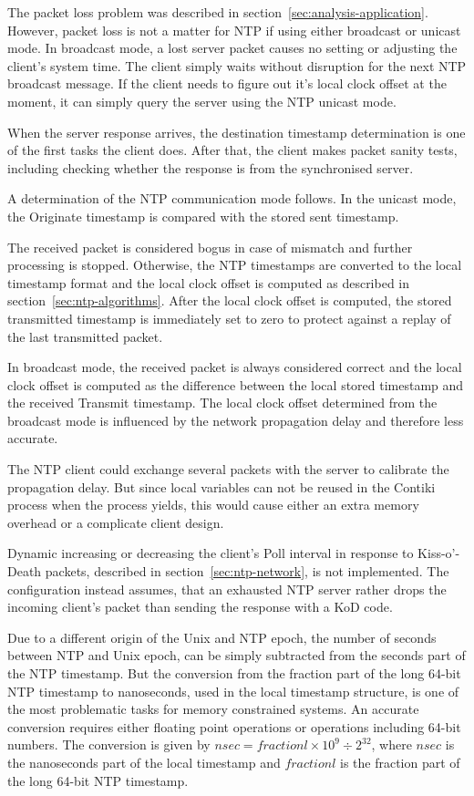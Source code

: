 The packet loss problem was described in section~\ref{sec:analysis-application}.
However, packet loss is not a matter for NTP if using either broadcast or unicast mode.
In broadcast mode, a lost server packet causes no setting or adjusting the client's system time.
The client simply waits without disruption for the next NTP broadcast message.
If the client needs to figure out it's local clock offset at the moment,
it can simply query the server using the NTP unicast mode.



When the server response arrives,
the destination timestamp determination is one of the first tasks the client does.
After that, the client makes packet sanity tests, including
checking whether the response is from the synchronised server.

A determination of the NTP communication mode follows.
In the unicast mode, the Originate timestamp is compared with the stored sent timestamp.

The received packet is considered bogus in case of mismatch and further processing is stopped.
Otherwise, the NTP timestamps are converted to the local timestamp format and
the local clock offset is computed as described in section~\ref{sec:ntp-algorithms}.
After the local clock offset is computed,
the stored transmitted timestamp is immediately set to zero
to protect against a replay of the last transmitted packet.

In broadcast mode, the received packet is always considered correct
and the local clock offset is computed as the difference between the local stored timestamp
and the received Transmit timestamp.
The local clock offset determined from the broadcast mode
is influenced by the network propagation delay and therefore less accurate.

The NTP client could exchange several packets with the server to calibrate the propagation delay.
But since local variables can not be reused in the Contiki process when the process yields,
this would cause either an extra memory overhead or a complicate client design.


Dynamic increasing or decreasing the client's Poll interval in response to
Kiss-o'-Death packets, described in section~\ref{sec:ntp-network}, is not implemented.
The configuration instead assumes, that an exhausted NTP server rather drops the incoming
client's packet than sending the response with a KoD code.


Due to a different origin of the Unix and NTP epoch,
the number of seconds between NTP and Unix epoch,
can be simply subtracted from the seconds part of the NTP timestamp.
But the conversion from the fraction part of the long 64-bit NTP timestamp to nanoseconds,
used in the local timestamp structure, %
is one of the most problematic tasks for memory constrained systems.
An accurate conversion requires either floating point operations or operations including 64-bit numbers.
The conversion is given by
$nsec = fractionl \times 10^9 \div 2^{32}$, where $nsec$ is the nanoseconds part of the local timestamp
and $fractionl$ is the fraction part of the long 64-bit NTP timestamp.

